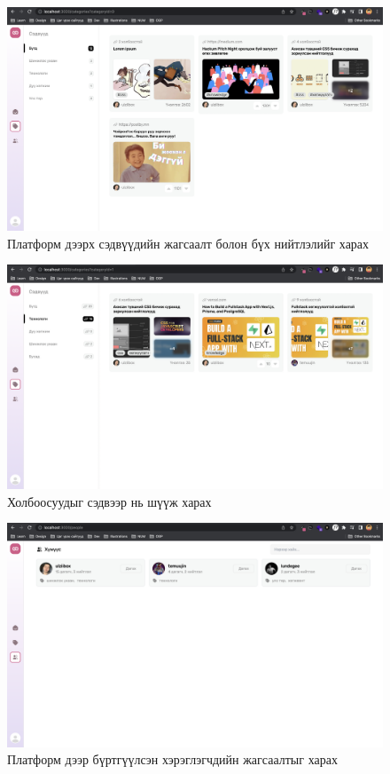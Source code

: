 \begin{figure}[h]
	\centering
	\includegraphics[width=13cm]{images/implement/category.png}
	\caption{Платформ дээрх сэдвүүдийн жагсаалт болон бүх нийтлэлийг харах}
	\label{fig:category}
\end{figure}

\begin{figure}[h]
	\centering
	\includegraphics[width=13cm]{images/implement/category-filter.png}
	\caption{Холбоосуудыг сэдвээр нь шүүж харах}
	\label{fig:category-filter}
\end{figure}

\begin{figure}[h]
	\centering
	\includegraphics[width=13cm]{images/implement/users.png}
	\caption{Платформ дээр бүртгүүлсэн хэрэглэгчдийн жагсаалтыг харах}
	\label{fig:users}
\end{figure}

